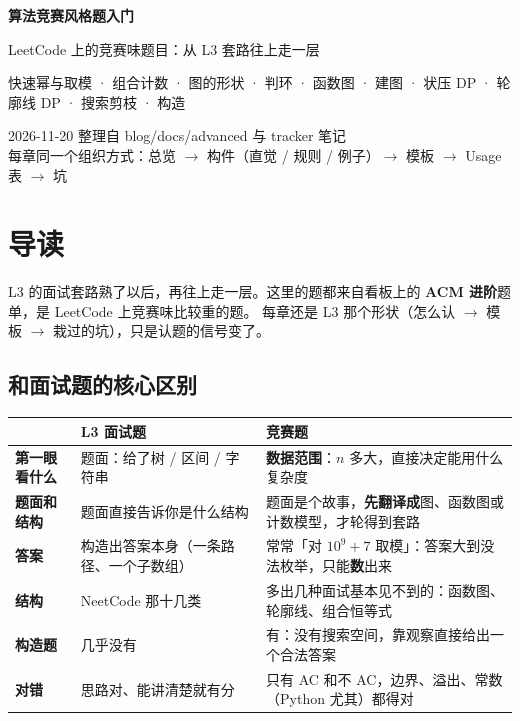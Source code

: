 \begin{titlepage}
\vspace*{5cm}
\begin{center}
{\Huge\bfseries 算法竞赛风格题入门}\par\vspace{10pt}
{\Large LeetCode 上的竞赛味题目：从 L3 套路往上走一层}\par\vspace{24pt}
{\large 快速幂与取模 · 组合计数 · 图的形状 · 判环 · 函数图 · 建图 · 状压 DP · 轮廓线 DP · 搜索剪枝 · 构造}\par
\vfill
{\color{note} 2026-11-20 整理自 blog/docs/advanced 与 tracker 笔记\\
每章同一个组织方式：总览 $\to$ 构件（直觉 / 规则 / 例子）$\to$ 模板 $\to$ Usage 表 $\to$ 坑}
\end{center}
\end{titlepage}

\tableofcontents
\clearpage

\section*{导读}

L3 的面试套路熟了以后，再往上走一层。这里的题都来自看板上的 \textbf{ACM 进阶}题单，是 LeetCode 上竞赛味比较重的题。
每章还是 L3 那个形状（怎么认 $\to$ 模板 $\to$ 栽过的坑），只是认题的信号变了。

\subsection*{和面试题的核心区别}

\begin{tabularx}{\linewidth}{@{}>{\bfseries}l X X@{}}
\toprule
& \textbf{L3 面试题} & \textbf{竞赛题}\\
\midrule
第一眼看什么 & 题面：给了树 / 区间 / 字符串 & \textbf{数据范围}：$n$ 多大，直接决定能用什么复杂度\\
题面和结构 & 题面直接告诉你是什么结构 & 题面是个故事，\textbf{先翻译成}图、函数图或计数模型，才轮得到套路\\
答案 & 构造出答案本身（一条路径、一个子数组） & 常常「对 $10^9+7$ 取模」：答案大到没法枚举，只能\textbf{数}出来\\
结构 & NeetCode 那十几类 & 多出几种面试基本见不到的：函数图、轮廓线、组合恒等式\\
构造题 & 几乎没有 & 有：没有搜索空间，靠观察直接给出一个合法答案\\
对错 & 思路对、能讲清楚就有分 & 只有 AC 和不 AC，边界、溢出、常数（Python 尤其）都得对\\
\bottomrule
\end{tabularx}

